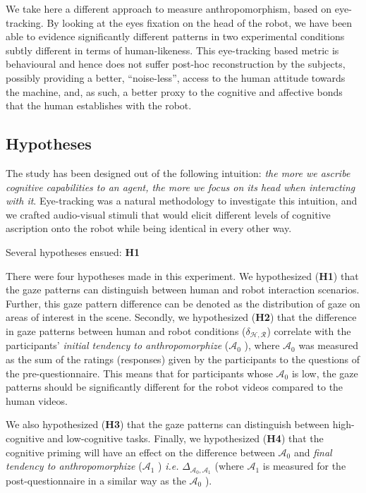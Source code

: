 \documentclass[lettersize, apacite, twoside, HRI]{apa_HRI}
\newcommand{\ie}{\textit{i.e.}\xspace}
\newcommand{\h}[1]{\textbf{H#1}\xspace}
\newcommand{\anti}{{$\mathcal{A}_0$ }}
\newcommand{\antf}{{$\mathcal{A}_1$ }}
\newcommand{\deltaant}{{ $\Delta_{\mathcal{A}_0,\mathcal{A}_1}$ }}
\begin{document}
We take here a different approach to measure anthropomorphism, based on
eye-tracking.  By looking at the eyes fixation on the head of the robot, we have
been able to evidence significantly different patterns in two experimental
conditions subtly different in terms of human-likeness. This eye-tracking based
metric is behavioural and hence does not suffer post-hoc reconstruction by the
subjects, possibly providing a better, ``noise-less'', access to the human
attitude towards the machine, and, as such, a better proxy to the cognitive and
affective bonds that the human establishes with the robot.


\subsection{Hypotheses}

The study has been designed out of the following intuition: \emph{the more we
ascribe cognitive capabilities to an agent, the more we focus on its head when
interacting with it}.  Eye-tracking was a natural methodology to investigate
this intuition, and we crafted audio-visual stimuli that would elicit different
levels of cognitive ascription onto the robot while being identical in every
other way.

Several hypotheses ensued: \h{1}

There were four hypotheses made in this experiment. We hypothesized (\textbf{H1}) that the gaze patterns can
distinguish between human and robot interaction scenarios. Further, this gaze
pattern difference can be denoted as the distribution of gaze on areas of
interest in the scene.  Secondly, we hypothesized (\textbf{H2}) that the
difference in gaze patterns between human and robot conditions
($\delta_{\mathcal{H},\mathcal{R}}$) correlate with the participants'
\textit{initial tendency to anthropomorphize} (\anti), where \anti was measured
as the sum of the ratings (responses) given by the participants to the questions
of the pre-questionnaire. This means that for participants whose \anti is low,
the gaze patterns should be significantly different for the robot videos
compared to the human videos.

We also hypothesized (\textbf{H3}) that the gaze patterns can distinguish
between high-cognitive and low-cognitive tasks. Finally, we hypothesized
(\textbf{H4}) that the cognitive priming will have an effect on the difference
between \anti and \textit{final tendency to anthropomorphize} (\antf) \ie
\deltaant (where \antf is measured for the post-questionnaire in a similar way
as the \anti).
\end{document}
